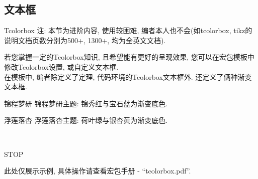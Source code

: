 \documentclass[hyperref, UTF8, CJK, aspectratio=169]{beamer}
\begin{document}









\subsection{文本框}
\begin{frame}{Tcolorbox}
	注: 本节为进阶内容, 使用较困难, 编者本人也不会(如tcolorbox, tikz的说明文档页数分别为500+, 1300+, 均为全英文文档).\newline\par
	若您掌握一定的Tcolorbox知识, 且希望能有更好的呈现效果, 您可以在宏包模板中修改Tcolorbox设置, 或自定义文本框.\\
	在模板中, 编者除定义了定理, 代码环境的Tcolorbox文本框外. 还定义了俩种渐变文本框.\\[.5ex]
	\begin{minipage}[c]{0.725\columnwidth}
		\begin{scutcbrb}{锦程梦研}
			锦程梦研主题: 锦秀红与宝石蓝为渐变底色.
		\end{scutcbrb}
		\begin{scutcbyg}{浮莲落杏}
			浮莲落杏主题: 荷叶绿与银杏黄为渐变底色.
		\end{scutcbyg}
	\end{minipage}~~~~
	\begin{minipage}[c]{0.225\columnwidth}
		\begin{tcolorbox}[enhanced,%
			size=minimal,auto outer arc,%
			width=2.1cm,octogon arc,%
			colback=red,colframe=white,colupper=white,%
			fontupper=\fontsize{7mm}{7mm}\selectfont\bfseries\sffamily,%
			halign=center,valign=center,%
			square,arc is angular,%
			borderline={0.2mm}{-1mm}{red}]
			STOP
		\end{tcolorbox}
	\end{minipage}
	\newline\par
	\color{scugreen}此处仅展示示例, 具体操作请查看宏包手册 - ``tcolorbox.pdf''.
\end{frame}
\end{document}
